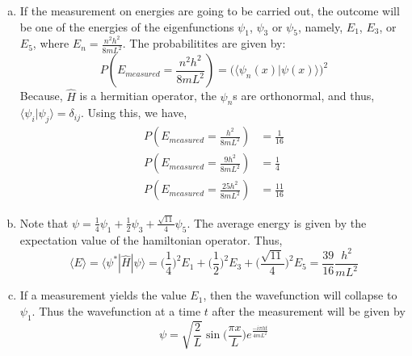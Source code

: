 \documentclass[10pt, a4paper]{article}
\begin{document}
\begin{enumerate}
\begin{enumerate}[(a)]
			\item If the measurement on energies are going to be carried out, the outcome will be one of the energies of the eigenfunctions $\psi_1$, $\psi_3$ or $\psi_5$, namely, $E_1$, $E_3$, or $E_5$, where $E_n = \frac{n^2h^2}{8mL^2}$. The probabilitites are given by:
			\[ P(E_{measured} = \frac{n^2h^2}{8mL^2}) = \Big(\langle \psi_n(x) | \psi(x) \rangle\Big)^2 \]
			Because, $\hat{H}$ is a hermitian operator, the $\psi_n$s are orthonormal, and thus, $\langle \psi_i | \psi_j \rangle = \delta_{ij}$. Using this, we have,
			\begin{align*}
				P( E_{measured} = \frac{h^2}{8mL^2} ) &= \frac{1}{16}\\
				P( E_{measured} = \frac{9h^2}{8mL^2} ) &= \frac{1}{4}\\
				P( E_{measured} = \frac{25h^2}{8mL^2} ) &= \frac{11}{16}
			\end{align*}
			
			\item Note that $\psi = \frac{1}{4}\psi_1 + \frac{1}{2}\psi_3 + \frac{\sqrt{11}}{4}\psi_5$. The average energy is given by the expectation value of the hamiltonian operator. Thus,
			\[ \langle E \rangle = \langle \psi^* | \hat{H} | \psi \rangle = \Big(\frac{1}{4}\Big)^2E_1 + \Big(\frac{1}{2}\Big)^2E_3 + \Big(\frac{\sqrt{11}}{4}\Big)^2E_5 = \frac{39}{16}\frac{h^2}{mL^2} \]
			
			\item If a measurement yields the value $E_1$, then the wavefunction will collapse to $\psi_1$. Thus the wavefunction at a time $t$ after the measurement will be given by
			\[ \psi = \sqrt{\frac{2}{L}}\sin\Big(\frac{\pi x}{L}\Big)e^{\frac{-i\pi ht}{4mL^2}} \]
			
		\end{enumerate}
	\end{enumerate}
\end{document}
